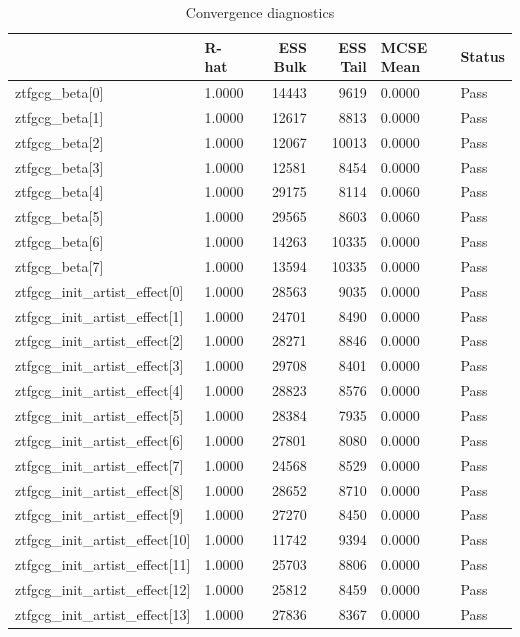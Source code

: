 \begin{table}[htbp]
\caption{Convergence diagnostics}
\label{tab:diagnostics}
\begin{tabular}{llrrll}
\toprule
 & R-hat & ESS Bulk & ESS Tail & MCSE Mean & Status \\
\midrule
ztfgcg\_beta[0] & 1.0000 & 14443 & 9619 & 0.0000 & Pass \\
ztfgcg\_beta[1] & 1.0000 & 12617 & 8813 & 0.0000 & Pass \\
ztfgcg\_beta[2] & 1.0000 & 12067 & 10013 & 0.0000 & Pass \\
ztfgcg\_beta[3] & 1.0000 & 12581 & 8454 & 0.0000 & Pass \\
ztfgcg\_beta[4] & 1.0000 & 29175 & 8114 & 0.0060 & Pass \\
ztfgcg\_beta[5] & 1.0000 & 29565 & 8603 & 0.0060 & Pass \\
ztfgcg\_beta[6] & 1.0000 & 14263 & 10335 & 0.0000 & Pass \\
ztfgcg\_beta[7] & 1.0000 & 13594 & 10335 & 0.0000 & Pass \\
ztfgcg\_init\_artist\_effect[0] & 1.0000 & 28563 & 9035 & 0.0000 & Pass \\
ztfgcg\_init\_artist\_effect[1] & 1.0000 & 24701 & 8490 & 0.0000 & Pass \\
ztfgcg\_init\_artist\_effect[2] & 1.0000 & 28271 & 8846 & 0.0000 & Pass \\
ztfgcg\_init\_artist\_effect[3] & 1.0000 & 29708 & 8401 & 0.0000 & Pass \\
ztfgcg\_init\_artist\_effect[4] & 1.0000 & 28823 & 8576 & 0.0000 & Pass \\
ztfgcg\_init\_artist\_effect[5] & 1.0000 & 28384 & 7935 & 0.0000 & Pass \\
ztfgcg\_init\_artist\_effect[6] & 1.0000 & 27801 & 8080 & 0.0000 & Pass \\
ztfgcg\_init\_artist\_effect[7] & 1.0000 & 24568 & 8529 & 0.0000 & Pass \\
ztfgcg\_init\_artist\_effect[8] & 1.0000 & 28652 & 8710 & 0.0000 & Pass \\
ztfgcg\_init\_artist\_effect[9] & 1.0000 & 27270 & 8450 & 0.0000 & Pass \\
ztfgcg\_init\_artist\_effect[10] & 1.0000 & 11742 & 9394 & 0.0000 & Pass \\
ztfgcg\_init\_artist\_effect[11] & 1.0000 & 25703 & 8806 & 0.0000 & Pass \\
ztfgcg\_init\_artist\_effect[12] & 1.0000 & 25812 & 8459 & 0.0000 & Pass \\
ztfgcg\_init\_artist\_effect[13] & 1.0000 & 27836 & 8367 & 0.0000 & Pass \\

\end{tabular}
\end{table}
